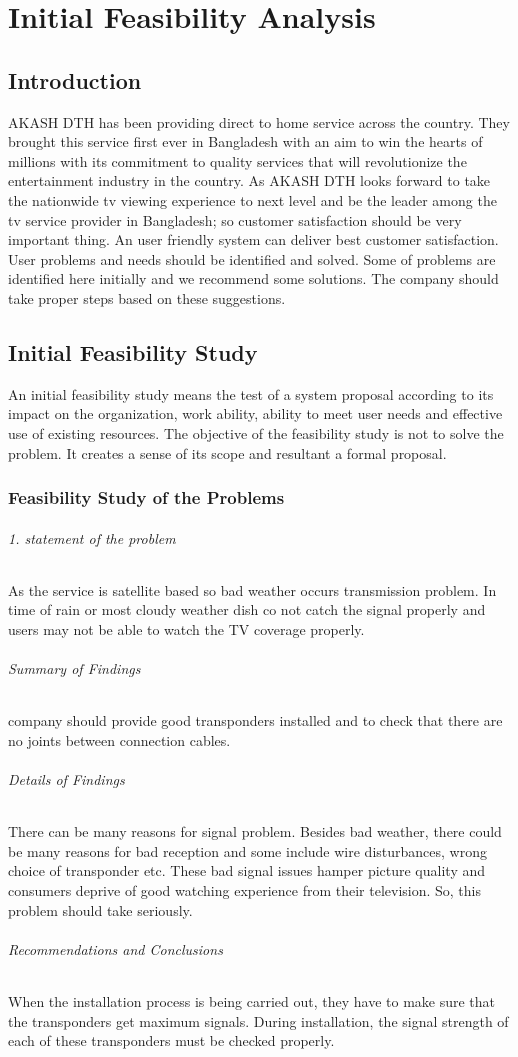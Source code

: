 \chapter{Initial Feasibility Analysis}
\begin{spacing}{1.0}
\setlength{\parskip}{0.2in}

\section{Introduction}
AKASH DTH has been providing direct to home service across the country. They brought this service first ever in Bangladesh with an aim to win the hearts of millions with its commitment to quality services that will revolutionize the entertainment industry in the country.
\newline
As AKASH DTH looks forward to take the nationwide tv viewing experience to next level and be the leader among the tv service provider in Bangladesh; so customer satisfaction should be very important thing. An user friendly system can deliver best customer satisfaction. User problems and needs should be identified and solved. Some of problems are identified here initially and we recommend some solutions. The company should take proper steps based on these suggestions.

\section{Initial Feasibility Study}
An initial feasibility study means the test of a system proposal according to its impact on the organization, work ability, ability to meet user needs and effective use of existing resources. The objective of the feasibility study is not to solve the problem. It creates a sense of its scope and resultant a formal proposal.
\subsection{Feasibility Study of the Problems}
\subparagraph{1. statement of the problem}
As the service is satellite based so bad weather occurs transmission problem. In time of rain or most cloudy weather dish co not catch the signal properly and users may not be able to watch the TV coverage properly.
\subparagraph{Summary of Findings}
company should provide good transponders installed and to check that there are no joints between connection cables.
\subparagraph{Details of Findings}
There can be many reasons for signal problem. Besides bad weather, there could be many reasons for bad reception and some include wire disturbances, wrong choice of transponder etc. These bad signal issues hamper picture quality and consumers deprive of good watching experience from their television. So, this problem should take seriously.
\subparagraph{Recommendations and Conclusions}
When the installation process is being carried out, they have to make sure that the transponders get maximum signals. During installation, the signal strength of each of these transponders must be checked properly.


\end{spacing}
